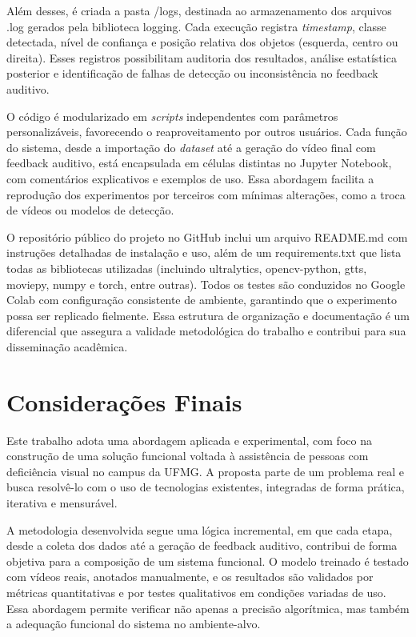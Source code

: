 Além desses, é criada a pasta /logs, destinada ao armazenamento dos arquivos .log gerados pela biblioteca logging. Cada execução registra \textit{timestamp}, classe detectada, nível de confiança e posição relativa dos objetos (esquerda, centro ou direita). Esses registros possibilitam auditoria dos resultados, análise estatística posterior e identificação de falhas de detecção ou inconsistência no feedback auditivo.

O código é modularizado em \textit{scripts} independentes com parâmetros personalizáveis, favorecendo o reaproveitamento por outros usuários. Cada função do sistema, desde a importação do \textit{dataset} até a geração do vídeo final com feedback auditivo, está encapsulada em células distintas no Jupyter Notebook, com comentários explicativos e exemplos de uso. Essa abordagem facilita a reprodução dos experimentos por terceiros com mínimas alterações, como a troca de vídeos ou modelos de detecção.

O repositório público do projeto no GitHub inclui um arquivo README.md com instruções detalhadas de instalação e uso, além de um requirements.txt que lista todas as bibliotecas utilizadas (incluindo ultralytics, opencv-python, gtts, moviepy, numpy e torch, entre outras). Todos os testes são conduzidos no Google Colab com configuração consistente de ambiente, garantindo que o experimento possa ser replicado fielmente. Essa estrutura de organização e documentação é um diferencial que assegura a validade metodológica do trabalho e contribui para sua disseminação acadêmica.

\section{Considerações Finais}

Este trabalho adota uma abordagem aplicada e experimental, com foco na construção de uma solução funcional voltada à assistência de pessoas com deficiência visual no campus da UFMG. A proposta parte de um problema real e busca resolvê-lo com o uso de tecnologias existentes, integradas de forma prática, iterativa e mensurável.

A metodologia desenvolvida segue uma lógica incremental, em que cada etapa, desde a coleta dos dados até a geração de feedback auditivo, contribui de forma objetiva para a composição de um sistema funcional. O modelo treinado é testado com vídeos reais, anotados manualmente, e os resultados são validados por métricas quantitativas e por testes qualitativos em condições variadas de uso. Essa abordagem permite verificar não apenas a precisão algorítmica, mas também a adequação funcional do sistema no ambiente-alvo.

